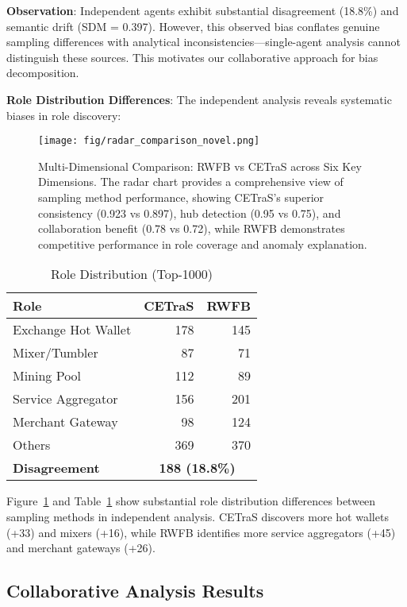 \documentclass[conference]{IEEEtran}
\begin{document}
\textbf{Observation}: Independent agents exhibit substantial disagreement (18.8\%) and semantic drift (SDM = 0.397). However, this observed bias conflates genuine sampling differences with analytical inconsistencies---single-agent analysis cannot distinguish these sources. This motivates our collaborative approach for bias decomposition.

\textbf{Role Distribution Differences}: The independent analysis reveals systematic biases in role discovery:

\begin{figure}[!t]
  \centering
  \texttt{[image: fig/radar\_comparison\_novel.png]}
  \caption{Multi-Dimensional Comparison: RWFB vs CETraS across Six Key Dimensions. The radar chart provides a comprehensive view of sampling method performance, showing CETraS's superior consistency (0.923 vs 0.897), hub detection (0.95 vs 0.75), and collaboration benefit (0.78 vs 0.72), while RWFB demonstrates competitive performance in role coverage and anomaly explanation.}
  \label{fig:roles-compare-1000}
\end{figure}

\begin{table}[!t]
\centering
\caption{Role Distribution (Top-1000)}
\label{tab:roles-dist}
\small
\begin{tabular}{l r r}
\toprule
Role & CETraS & RWFB \\
\midrule
Exchange Hot Wallet & 178 & 145 \\
Mixer/Tumbler & 87 & 71 \\
Mining Pool & 112 & 89 \\
Service Aggregator & 156 & 201 \\
Merchant Gateway & 98 & 124 \\
Others & 369 & 370 \\
\midrule
\textbf{Disagreement} & \multicolumn{2}{c}{\textbf{188 (18.8\%)}} \\
\bottomrule
\end{tabular}
\end{table}

Figure~\ref{fig:roles-compare-1000} and Table~\ref{tab:roles-dist} show substantial role distribution differences between sampling methods in independent analysis. CETraS discovers more hot wallets (+33) and mixers (+16), while RWFB identifies more service aggregators (+45) and merchant gateways (+26).

\subsection{Collaborative Analysis Results}
\end{document}
